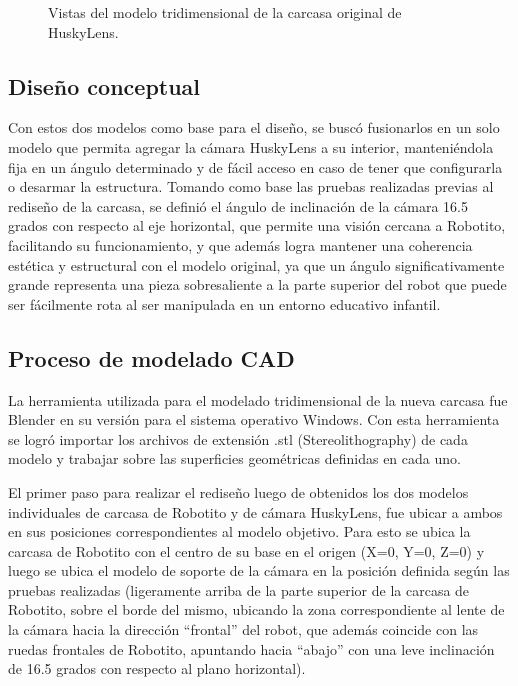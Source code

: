 \documentclass{prgrado}
\begin{document}
\begin{appendix}
\begin{figure}[htbp]
    \caption{Vistas del modelo tridimensional de la carcasa original de HuskyLens.}
    \label{fig:carcasa-husky-original}
\end{figure}

\FloatBarrier 

\subsection{Diseño conceptual}

Con estos dos modelos como base para el diseño, se buscó fusionarlos en un solo modelo que permita agregar la cámara HuskyLens a su interior, manteniéndola fija en un ángulo determinado y de fácil acceso en caso de tener que configurarla o desarmar la estructura. Tomando como base las pruebas realizadas previas al rediseño de la carcasa, se definió el ángulo de inclinación de la cámara 16.5 grados con respecto al eje horizontal, que permite una visión cercana a Robotito, facilitando su funcionamiento, y que además logra mantener una coherencia estética y estructural con el modelo original, ya que un ángulo significativamente grande representa una pieza sobresaliente a la parte superior del robot que puede ser fácilmente rota al ser manipulada en un entorno educativo infantil.

\subsection{Proceso de modelado CAD}

La herramienta utilizada para el modelado tridimensional de la nueva carcasa fue Blender \cite{Blender} en su versión para el sistema operativo Windows. Con esta herramienta se logró importar los archivos de extensión .stl (Stereolithography) de cada modelo y trabajar sobre las superficies geométricas definidas en cada uno.

El primer paso para realizar el rediseño luego de obtenidos los dos modelos individuales de carcasa de Robotito y de cámara HuskyLens, fue ubicar a ambos en sus posiciones correspondientes al modelo objetivo. Para esto se ubica la carcasa de Robotito con el centro de su base en el origen (X=0, Y=0, Z=0) y luego se ubica el modelo de soporte de la cámara en la posición definida según las pruebas realizadas (ligeramente arriba de la parte superior de la carcasa de Robotito, sobre el borde del mismo, ubicando la zona correspondiente al lente de la cámara hacia la dirección ``frontal'' del robot, que además coincide con las ruedas frontales de Robotito, apuntando hacia ``abajo'' con una leve inclinación de 16.5 grados con respecto al plano horizontal).


\end{appendix}
\end{document}
